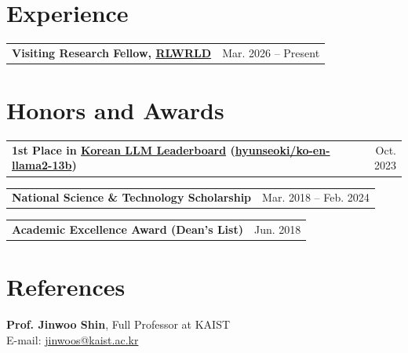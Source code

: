 \documentclass[11pt,a4paper]{article}
\makeatletter
\newcommand{\entry}[2]{%
  \noindent\begin{tabularx}{\linewidth}{@{}X@{}r@{}}
    \textbf{#1} & {\small #2}
  \end{tabularx}\par}
\makeatother
\begin{document}
\section{Experience}
\entry{Visiting Research Fellow,\; \href{https://www.rlwrld.ai}{RLWRLD}}{Mar. 2026 -- Present}

\section{Honors and Awards}
\entry{1st Place in \href{https://huggingface.co/spaces/upstage/open-ko-llm-leaderboard}{Korean LLM Leaderboard} (\href{https://huggingface.co/hyunseoki/ko-en-llama2-13b}{hyunseoki/ko-en-llama2-13b})}{Oct. 2023}
\vspace{4pt}
\entry{National Science \& Technology Scholarship}{Mar. 2018 -- Feb. 2024}
\vspace{4pt}
\entry{Academic Excellence Award (Dean's List)}{Jun. 2018}

\section{References}
\textbf{Prof. Jinwoo Shin}, Full Professor at KAIST\\
E-mail: \href{mailto:jinwoos@kaist.ac.kr}{jinwoos@kaist.ac.kr}
\end{document}

